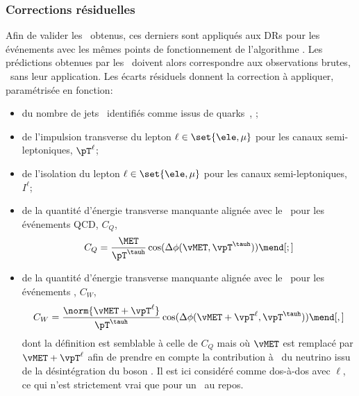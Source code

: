 \subsubsection{Corrections résiduelles}
Afin de valider les \fakefactors\ obtenus, ces derniers sont appliqués aux DRs pour les événements avec les mêmes points de fonctionnement de l'algorithme \DEEPTAU.
Les prédictions obtenues par les \fakefactors\ doivent alors correspondre aux observations brutes, \ie\ sans leur application.
Les écarts résiduels donnent la correction à appliquer, paramétrisée en fonction:
\begin{itemize}
\item du nombre de jets \Nprebjets\ identifiés comme issus de quarks~\quarkb, \Nbjets;
\item de l'impulsion transverse du lepton $\ell\in\set{\ele,\mu}$ pour les canaux semi-leptoniques, $\pT^{\ell}$;
\item de l'isolation du lepton $\ell\in\set{\ele,\mu}$ pour les canaux semi-leptoniques, $I^{\ell}$;
\item de la quantité d'énergie transverse manquante alignée avec le \tauh\ pour les événements QCD, $C_Q$,
\begin{equation}
C_Q = \frac{\MET}{\pT^{\tauh}} \cos(\Delta\phi(\vMET, \vpT^{\tauh}))
\mend[;]
\label{eq-FF_CQ_def}
\end{equation}
\item de la quantité d'énergie transverse manquante alignée avec le \tauh\ pour les événements \Wjets, $C_W$,
\begin{equation}
C_W = \frac{\norm{\vMET + \vpT^{\ell}}}{\pT^{\tauh}} \cos(\Delta\phi(\vMET + \vpT^{\ell}, \vpT^{\tauh}))
\mend[,]
\label{eq-FF_CW_def}
\end{equation}
dont la définition est semblable à celle de $C_Q$ mais où $\vMET$ est remplacé par $\vMET + \vpT^{\ell}$ afin de prendre en compte la contribution à \MET\ du neutrino issu de la désintégration du boson \Wboson.
Il est ici considéré comme dos-à-dos avec $\ell$, ce qui n'est strictement vrai que pour un \Wboson\ au repos.
\end{itemize}
